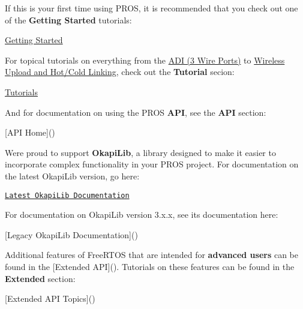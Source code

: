 If this is your first time using P\+R\+OS, it is recommended that you check out one of the {\bfseries Getting Started} tutorials\+:

\hyperlink{getting-started_2index_8md}{Getting Started}

For topical tutorials on everything from the \hyperlink{adi_8md}{A\+DI (3 Wire Ports)} to \hyperlink{wireless-upload_8md}{Wireless Upload and Hot/\+Cold Linking}, check out the {\bfseries Tutorial} secion\+:

\hyperlink{tutorials_2index_8md}{Tutorials}

And for documentation on using the P\+R\+OS {\bfseries A\+PI}, see the {\bfseries A\+PI} section\+:

\mbox{[}A\+PI Home\mbox{]}()

We\textquotesingle{}re proud to support {\bfseries Okapi\+Lib}, a library designed to make it easier to incorporate complex functionality in your P\+R\+OS project. For documentation on the latest Okapi\+Lib version, go here\+:

\href{https://okapilib.github.io/OkapiLib/index.html}{\tt Latest Okapi\+Lib Documentation}

For documentation on Okapi\+Lib version 3.\+x.\+x, see its documentation here\+:

\mbox{[}Legacy Okapi\+Lib Documentation\mbox{]}()

Additional features of Free\+R\+T\+OS that are intended for {\bfseries advanced users} can be found in the \mbox{[}Extended A\+PI\mbox{]}(). Tutorials on these features can be found in the {\bfseries Extended} section\+:

\mbox{[}Extended A\+PI Topics\mbox{]}() 